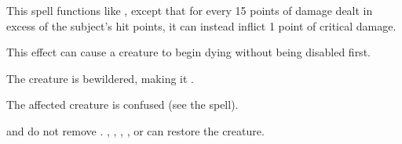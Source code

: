 \begin{spelleffect}
  This spell functions like , except that for every 15 points of damage dealt in excess of the subject's hit points, it can instead inflict 1 point of critical damage.
\end{spelleffect}
\begin{spellnotes}
  This effect can cause a creature to begin dying without being disabled first.
\end{spellnotes}

\begin{spellhealthy}
  The creature is bewildered, making it \vulnerable.
\end{spellhealthy}
\begin{spellblood}
  \par The affected creature is confused (see the  spell).
\end{spellblood}
\begin{spellnotes}
    and  do not remove . , , , , or  can restore the creature.
\end{spellnotes}


